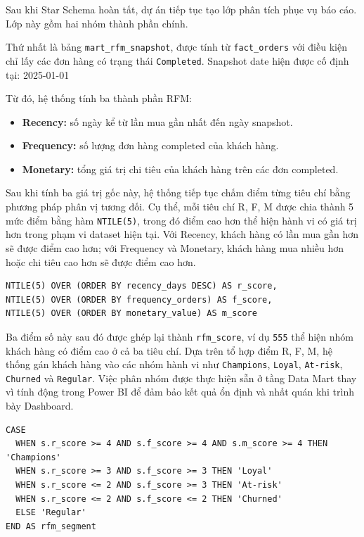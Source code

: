 \documentclass[12pt,a4paper]{article}
\newcommand{\code}[1]{\texttt{#1}}
\begin{document}
Sau khi Star Schema hoàn tất, dự án tiếp tục tạo lớp phân tích phục vụ báo cáo. Lớp này gồm hai nhóm thành phần chính.

Thứ nhất là bảng \code{mart\_rfm\_snapshot}, được tính từ \code{fact\_orders} với điều kiện chỉ lấy các đơn hàng có trạng thái \code{Completed}. Snapshot date hiện được cố định tại: 2025-01-01

Từ đó, hệ thống tính ba thành phần RFM:

\begin{itemize}
    \item \textbf{Recency:} số ngày kể từ lần mua gần nhất đến ngày snapshot.
    \item \textbf{Frequency:} số lượng đơn hàng completed của khách hàng.
    \item \textbf{Monetary:} tổng giá trị chi tiêu của khách hàng trên các đơn completed.
\end{itemize}

Sau khi tính ba giá trị gốc này, hệ thống tiếp tục chấm điểm từng tiêu chí bằng phương pháp phân vị tương đối. Cụ thể, mỗi tiêu chí R, F, M được chia thành 5 mức điểm bằng hàm \code{NTILE(5)}, trong đó điểm cao hơn thể hiện hành vi có giá trị hơn trong phạm vi dataset hiện tại. Với Recency, khách hàng có lần mua gần hơn sẽ được điểm cao hơn; với Frequency và Monetary, khách hàng mua nhiều hơn hoặc chi tiêu cao hơn sẽ được điểm cao hơn.

\begin{lstlisting}[style=sqlstyle]
NTILE(5) OVER (ORDER BY recency_days DESC) AS r_score,
NTILE(5) OVER (ORDER BY frequency_orders) AS f_score,
NTILE(5) OVER (ORDER BY monetary_value) AS m_score
\end{lstlisting}

Ba điểm số này sau đó được ghép lại thành \code{rfm\_score}, ví dụ \code{555} thể hiện nhóm khách hàng có điểm cao ở cả ba tiêu chí. Dựa trên tổ hợp điểm R, F, M, hệ thống gán khách hàng vào các nhóm hành vi như \code{Champions}, \code{Loyal}, \code{At-risk}, \code{Churned} và \code{Regular}. Việc phân nhóm được thực hiện sẵn ở tầng Data Mart thay vì tính động trong Power BI để đảm bảo kết quả ổn định và nhất quán khi trình bày Dashboard.

\begin{lstlisting}[style=sqlstyle]
CASE
  WHEN s.r_score >= 4 AND s.f_score >= 4 AND s.m_score >= 4 THEN 'Champions'
  WHEN s.r_score >= 3 AND s.f_score >= 3 THEN 'Loyal'
  WHEN s.r_score <= 2 AND s.f_score >= 3 THEN 'At-risk'
  WHEN s.r_score <= 2 AND s.f_score <= 2 THEN 'Churned'
  ELSE 'Regular'
END AS rfm_segment
\end{lstlisting}
\end{document}
